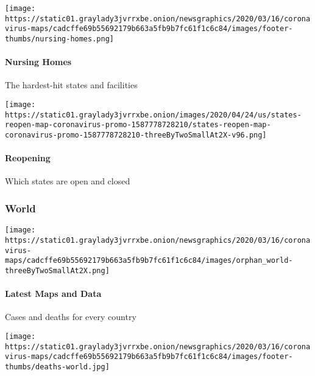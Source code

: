 \texttt{[image: https://static01.graylady3jvrrxbe.onion/newsgraphics/2020/03/16/coronavirus-maps/cadcffe69b55692179b663a5fb9b7fc61f1c6c84/images/footer-thumbs/nursing-homes.png]}

\hypertarget{nursing-homes}{%
\paragraph{Nursing Homes}\label{nursing-homes}}

The hardest-hit states and facilities

\href{https://www.nytimes3xbfgragh.onion/interactive/2020/us/states-reopen-map-coronavirus.html}{}

\texttt{[image: https://static01.graylady3jvrrxbe.onion/images/2020/04/24/us/states-reopen-map-coronavirus-promo-1587778728210/states-reopen-map-coronavirus-promo-1587778728210-threeByTwoSmallAt2X-v96.png]}

\hypertarget{reopening}{%
\paragraph{Reopening}\label{reopening}}

Which states are open and closed

\hypertarget{world}{%
\subsubsection{World}\label{world}}

\href{https://www.nytimes3xbfgragh.onion/interactive/2020/world/coronavirus-maps.html}{}

\texttt{[image: https://static01.graylady3jvrrxbe.onion/newsgraphics/2020/03/16/coronavirus-maps/cadcffe69b55692179b663a5fb9b7fc61f1c6c84/images/orphan\_world-threeByTwoSmallAt2X.png]}

\hypertarget{latest-maps-and-data-1}{%
\paragraph{Latest Maps and Data}\label{latest-maps-and-data-1}}

Cases and deaths for every country

\href{https://www.nytimes3xbfgragh.onion/interactive/2020/04/21/world/coronavirus-missing-deaths.html}{}

\texttt{[image: https://static01.graylady3jvrrxbe.onion/newsgraphics/2020/03/16/coronavirus-maps/cadcffe69b55692179b663a5fb9b7fc61f1c6c84/images/footer-thumbs/deaths-world.jpg]}

